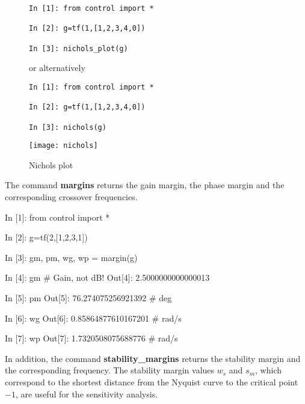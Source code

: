 \begin{figure}[htbp]
\begin{minipage}[t]{0.55\textwidth}
  \vspace{0pt}
\begin{lstlisting}[linewidth=7cm,xleftmargin=0cm]
In [1]: from control import *

In [2]: g=tf(1,[1,2,3,4,0])

In [3]: nichols_plot(g)
\end{lstlisting}

or alternatively

\begin{lstlisting}[linewidth=7cm,xleftmargin=0cm]
In [1]: from control import *

In [2]: g=tf(1,[1,2,3,4,0])

In [3]: nichols(g)
\end{lstlisting}

\end{minipage}%
\begin{minipage}[t]{0.5\textwidth}
  \vspace{0pt} \centering
  \texttt{[image: nichols]}
\end{minipage}
\caption{Nichols plot}
\label{F8}
\end{figure}

The command \textbf{margins} returns the gain margin, the phase margin and the 
corresponding crossover frequencies.

\begin{code}
In [1]: from control import *

In [2]: g=tf(2,[1,2,3,1])

In [3]: gm, pm, wg, wp = margin(g)

In [4]: gm			# Gain, not dB!
Out[4]: 2.5000000000000013

In [5]: pm
Out[5]: 76.274075256921392	# deg

In [6]: wg
Out[6]: 0.85864877610167201	# rad/s

In [7]: wp
Out[7]: 1.7320508075688776	# rad/s
\end{code}

In addition, the command \textbf{stability\_margins} returns the stability 
margin and the corresponding frequency. The stability margin values $w_s$ and 
$s_m$, which correspond to the shortest distance from the Nyquist curve to the 
critical point $-1$, are useful for the sensitivity analysis. 

